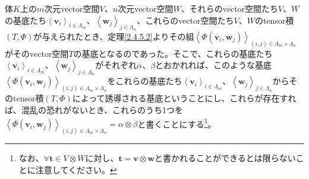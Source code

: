 \documentclass[dvipdfmx]{jsarticle}
\begin{document}
\begin{dfn}
体$K$上の$m$次元vector空間$V$、$n$次元vector空間$W$、それらのvector空間たち$V$、$W$の基底たち$\left\langle \mathbf{v}_{i} \right\rangle_{i \in \varLambda_{m}}$、$\left\langle \mathbf{w}_{j} \right\rangle_{j \in \varLambda_{n}}$、これらのvector空間たち$V$、$W$のtensor積$(T,\varPhi)$が与えられたとき、定理\ref{2.4.5.2}よりその組$\left\langle \varPhi\left( \mathbf{v}_{i},\mathbf{w}_{j} \right) \right\rangle_{(i,j) \in \varLambda_{m} \times \varLambda_{n}}$がそのvector空間$T$の基底となるのであった。そこで、これらの基底たち$\left\langle \mathbf{v}_{i} \right\rangle_{i \in \varLambda_{m}}$、$\left\langle \mathbf{w}_{j} \right\rangle_{j \in \varLambda_{n}}$がそれぞれ$\alpha$、$\beta$とおかれれば、このような基底$\left\langle \varPhi\left( \mathbf{v}_{i},\mathbf{w}_{j} \right) \right\rangle_{(i,j) \in \varLambda_{m} \times \varLambda_{n}}$をこれらの基底たち$\left\langle \mathbf{v}_{i} \right\rangle_{i \in \varLambda_{m}}$、$\left\langle \mathbf{w}_{j} \right\rangle_{j \in \varLambda_{n}}$からそのtensor積$(T,\varPhi)$によって誘導される基底ということにし、これらが存在すれば、混乱の恐れがないとき、これらのうち1つを$\left\langle \varPhi\left( \mathbf{v}_{i},\mathbf{w}_{j} \right) \right\rangle_{(i,j) \in \varLambda_{m} \times \varLambda_{n}} = \alpha \otimes \beta$と書くことにする\footnote{なお、$\forall\mathbf{t} \in V \otimes W$に対し、$\mathbf{t} = \mathbf{v} \otimes \mathbf{w}$と書かれることができるとは限らないことに注意してください。}。
\end{dfn}
\end{document}
